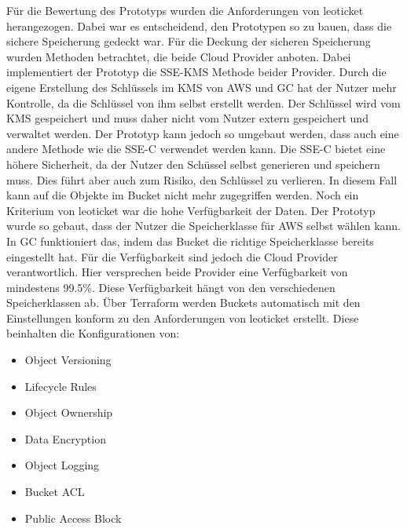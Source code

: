 Für die Bewertung des Prototyps wurden die Anforderungen von leoticket herangezogen. Dabei war es entscheidend, den Prototypen so zu bauen, dass die sichere Speicherung gedeckt war. Für die Deckung der sicheren Speicherung wurden Methoden betrachtet, die beide Cloud Provider anboten. Dabei implementiert der Prototyp die SSE-KMS Methode beider Provider. Durch die eigene Erstellung des Schlüssels im KMS von AWS und GC hat der Nutzer mehr Kontrolle, da die Schlüssel von ihm selbst erstellt werden. Der Schlüssel wird vom KMS gespeichert und muss daher nicht vom Nutzer extern gespeichert und verwaltet werden. Der Prototyp kann jedoch so umgebaut werden, dass auch eine andere Methode wie die SSE-C verwendet werden kann. Die SSE-C bietet eine höhere Sicherheit, da der Nutzer den Schüssel selbst generieren und speichern muss. Dies führt aber auch zum Risiko, den Schlüssel zu verlieren. In diesem Fall kann auf die Objekte im Bucket nicht mehr zugegriffen werden. Noch ein Kriterium von leoticket war die hohe Verfügbarkeit der Daten. Der Prototyp wurde so gebaut, dass der Nutzer die Speicherklasse für AWS selbst wählen kann. In GC funktioniert das, indem das Bucket die richtige Speicherklasse bereits eingestellt hat. Für die Verfügbarkeit sind jedoch die Cloud Provider verantwortlich. Hier versprechen beide Provider eine Verfügbarkeit von mindestens 99.5\%. Diese Verfügbarkeit hängt von den verschiedenen Speicherklassen ab. Über Terraform werden Buckets automatisch mit den Einstellungen konform zu den Anforderungen von leoticket erstellt. Diese beinhalten die Konfigurationen von:

\begin{itemize}
	\item Object Versioning
	\item Lifecycle Rules
	\item Object Ownership
	\item Data Encryption
	\item Object Logging
	\item Bucket ACL
	\item Public Access Block
\end{itemize}

